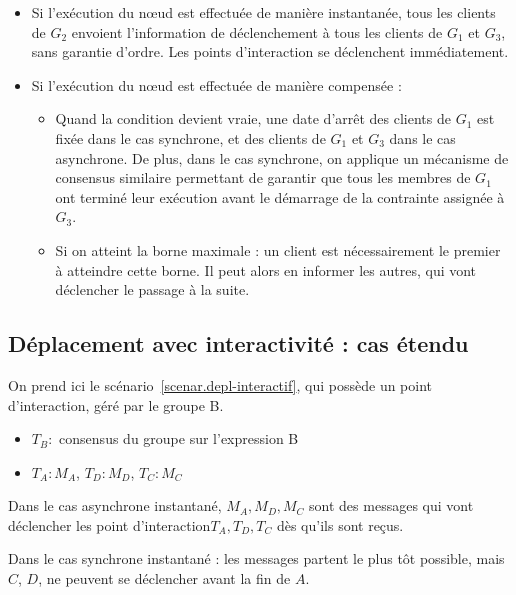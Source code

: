 \documentclass{article}
\newcommand\trigger{point d'interaction\xspace}
\newcommand\triggers{points d'interaction\xspace}
\begin{document}
\begin{itemize}
	\item Si l'exécution du nœud est effectuée de manière instantanée, tous les clients de $G_2$ envoient l'information de déclenchement à tous les clients de $G_1$ et $G_3$, sans garantie d'ordre.
	Les \triggers se déclenchent immédiatement.
	
	
	\item Si l'exécution du nœud est effectuée de manière compensée : 
	\begin{itemize}
		\item Quand la condition devient vraie, une date d'arrêt des clients de $G_1$ est fixée dans le cas synchrone, et des clients de $G_1$ et $G_3$ dans le cas asynchrone. 
		De plus, dans le cas synchrone, on applique un mécanisme de consensus similaire permettant de garantir que tous les membres de $G_1$ ont terminé leur exécution avant le démarrage de la contrainte assignée à $G_3$.
		\item Si on atteint la borne maximale : un client est nécessairement le premier à atteindre cette borne.
		Il peut alors en informer les autres, qui vont déclencher le passage à la suite.
	\end{itemize}
\end{itemize}

\subsection{Déplacement avec interactivité : cas étendu}
On prend ici le scénario~\ref{scenar.depl-interactif}, qui possède un \trigger, géré par le groupe B.
 
\begin{itemize}
	\item $T_B: $ consensus du groupe sur l'expression B
	\item $T_A: M_A$, $T_D: M_D$, $T_C: M_C$
\end{itemize}

Dans le cas asynchrone instantané, $M_A, M_D, M_C$ sont des messages qui vont déclencher les \trigger $T_A, T_D, T_C$ dès qu'ils sont reçus.

Dans le cas synchrone instantané : les messages partent le plus tôt possible, mais $C$, $D$, ne peuvent se déclencher avant la fin de $A$.
\end{document}
